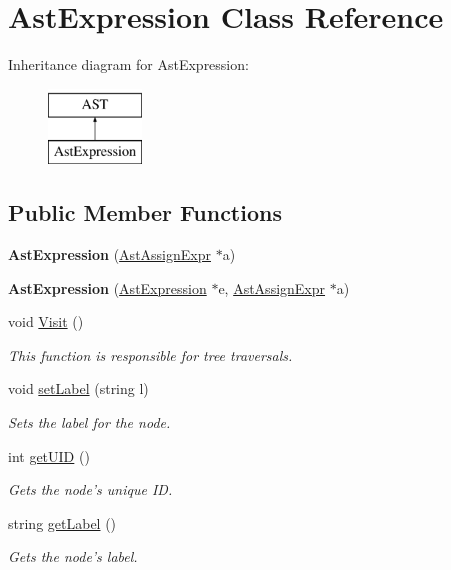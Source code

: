 \hypertarget{classAstExpression}{\section{Ast\-Expression Class Reference}
\label{classAstExpression}
}
Inheritance diagram for Ast\-Expression\-:\begin{figure}[H]
\begin{center}
\leavevmode
\includegraphics[height=2.000000cm]{classAstExpression}
\end{center}
\end{figure}
\subsection*{Public Member Functions}
\begin{DoxyCompactItemize}
\item 
\hypertarget{classAstExpression_a6c2ed06162eed9d5c420b3d3d0b1c5e4}{{\bfseries Ast\-Expression} (\hyperlink{classAstAssignExpr}{Ast\-Assign\-Expr} $\ast$a)}\label{classAstExpression_a6c2ed06162eed9d5c420b3d3d0b1c5e4}

\item 
\hypertarget{classAstExpression_ad02546e8d2ef52f3f2fb11baa95abdeb}{{\bfseries Ast\-Expression} (\hyperlink{classAstExpression}{Ast\-Expression} $\ast$e, \hyperlink{classAstAssignExpr}{Ast\-Assign\-Expr} $\ast$a)}\label{classAstExpression_ad02546e8d2ef52f3f2fb11baa95abdeb}

\item 
void \hyperlink{classAstExpression_acee231d1cd8e4c92393f023bc2f1ecf2}{Visit} ()
\begin{DoxyCompactList}\small\item\em This function is responsible for tree traversals. \end{DoxyCompactList}\item 
void \hyperlink{classAST_a71d680856e95ff89f55d5311a552eba6}{set\-Label} (string l)
\begin{DoxyCompactList}\small\item\em Sets the label for the node. \end{DoxyCompactList}\item 
int \hyperlink{classAST_ab7a5b1d9f1c2de0d98deb356f724a42c}{get\-U\-I\-D} ()
\begin{DoxyCompactList}\small\item\em Gets the node's unique I\-D. \end{DoxyCompactList}\item 
string \hyperlink{classAST_aee029be902fffc927d16ccb03eb922ad}{get\-Label} ()
\begin{DoxyCompactList}\small\item\em Gets the node's label. \end{DoxyCompactList}\end{DoxyCompactItemize}
